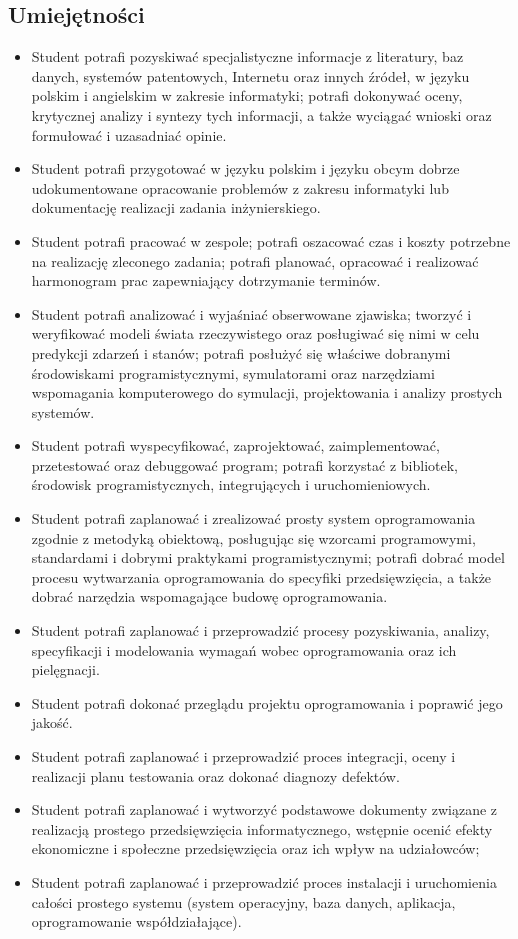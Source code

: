 \documentclass[12pt, a4paper]{article}
\begin{document}
\subsection*{Umiejętności}
\begin{itemize}
  \item Student potrafi pozyskiwać specjalistyczne informacje z literatury, baz danych, systemów patentowych, Internetu oraz innych źródeł, w języku polskim i angielskim w zakresie informatyki; potrafi dokonywać oceny, krytycznej analizy i syntezy tych informacji,  a także wyciągać wnioski oraz formułować i uzasadniać opinie.
  \item Student potrafi przygotować w języku polskim i języku obcym dobrze udokumentowane opracowanie problemów z zakresu informatyki lub dokumentację realizacji zadania inżynierskiego.
  \item Student potrafi pracować w zespole; potrafi oszacować czas i koszty potrzebne na realizację zleconego zadania; potrafi planować, opracować i realizować harmonogram prac zapewniający dotrzymanie terminów.
  \item Student potrafi analizować i wyjaśniać obserwowane zjawiska; tworzyć i weryfikować modeli świata rzeczywistego oraz posługiwać się nimi w celu predykcji zdarzeń i stanów; potrafi posłużyć się właściwe dobranymi środowiskami programistycznymi, symulatorami oraz narzędziami wspomagania komputerowego do symulacji, projektowania i analizy prostych systemów.
  \item Student potrafi wyspecyfikować,  zaprojektować, zaimplementować, przetestować oraz debuggować program; potrafi korzystać z bibliotek, środowisk programistycznych, integrujących i uruchomieniowych.
  \item Student potrafi zaplanować i zrealizować prosty system oprogramowania zgodnie z metodyką obiektową, posługując się wzorcami programowymi, standardami i dobrymi praktykami programistycznymi; potrafi dobrać model procesu wytwarzania oprogramowania do specyfiki przedsięwzięcia, a także dobrać narzędzia wspomagające budowę oprogramowania.
  \item Student potrafi zaplanować i przeprowadzić procesy pozyskiwania, analizy, specyfikacji i modelowania wymagań wobec oprogramowania oraz ich pielęgnacji.
  \item Student potrafi dokonać przeglądu projektu oprogramowania i poprawić jego jakość.
  \item Student potrafi zaplanować i przeprowadzić proces integracji, oceny i realizacji planu testowania oraz dokonać diagnozy defektów.
  \item Student potrafi zaplanować i wytworzyć podstawowe dokumenty związane z realizacją prostego przedsięwzięcia informatycznego, wstępnie ocenić efekty ekonomiczne i społeczne przedsięwzięcia oraz ich wpływ na udziałowców;
  \item Student potrafi zaplanować i przeprowadzić  proces instalacji i uruchomienia całości prostego systemu (system operacyjny, baza danych, aplikacja, oprogramowanie współdziałające).
\end{itemize}
\end{document}
